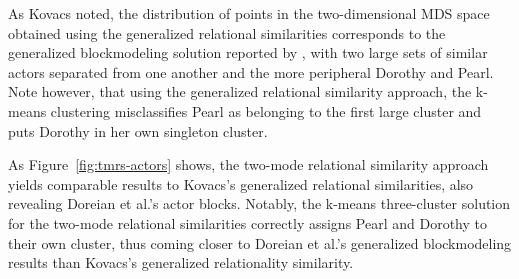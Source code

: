 \documentclass[a4paper,fleqn]{cas-sc}
\begin{document}
As Kovacs noted, the distribution of points in the two-dimensional MDS space obtained using the generalized relational similarities corresponds to the generalized blockmodeling solution reported by \citet{doreian2004}, with two large sets of similar actors separated from one another and the more peripheral Dorothy and Pearl. Note however, that using the generalized relational similarity approach, the k-means clustering misclassifies Pearl as belonging to the first large cluster and puts Dorothy in her own singleton cluster. 

As Figure~\ref{fig:tmrs-actors} shows, the two-mode relational similarity approach yields comparable results to Kovacs's generalized relational similarities, also revealing Doreian et al.'s actor blocks. Notably, the k-means three-cluster solution for the two-mode relational similarities correctly assigns Pearl and Dorothy to their own cluster, thus coming closer to Doreian et al.'s generalized blockmodeling results than Kovacs's generalized relationality similarity. 
\end{document}

